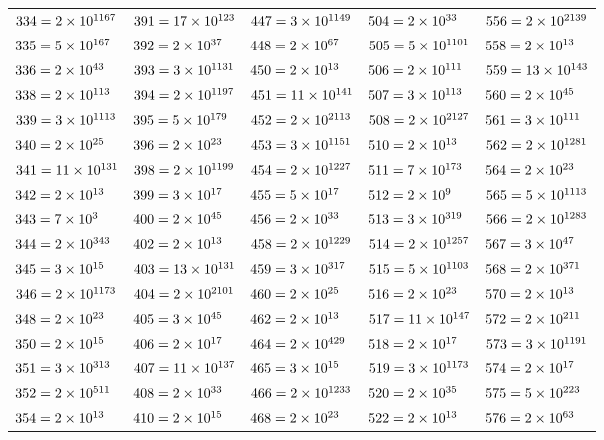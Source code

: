 \documentclass[10pt,a4paper]{book}
\begin{document}
\begin{tabular}{lllll}
	$334=\num{2e{1}167e{1}}$&$391=\num{17e{1}23e{1}}$&$447=\num{3e{1}149e{1}}$&$504=\num{2e{3}3e{2}7e{1}}$&$556=\num{2e{2}139e{1}}$\\
	$335=\num{5e{1}67e{1}}$&$392=\num{2e{3}7e{2}}$&$448=\num{2e{6}7e{1}}$&$505=\num{5e{1}101e{1}}$&$558=\num{2e{1}3e{2}31e{1}}$\\
	$336=\num{2e{4}3e{1}7e{1}}$&$393=\num{3e{1}131e{1}}$&$450=\num{2e{1}3e{2}5e{2}}$&$506=\num{2e{1}11e{1}23e{1}}$&$559=\num{13e{1}43e{1}}$\\
	$338=\num{2e{1}13e{2}}$&$394=\num{2e{1}197e{1}}$&$451=\num{11e{1}41e{1}}$&$507=\num{3e{1}13e{2}}$&$560=\num{2e{4}5e{1}7e{1}}$\\
	$339=\num{3e{1}113e{1}}$&$395=\num{5e{1}79e{1}}$&$452=\num{2e{2}113e{1}}$&$508=\num{2e{2}127e{1}}$&$561=\num{3e{1}11e{1}17e{1}}$\\
	$340=\num{2e{2}5e{1}17e{1}}$&$396=\num{2e{2}3e{2}11e{1}}$&$453=\num{3e{1}151e{1}}$&$510=\num{2e{1}3e{1}5e{1}17e{1}}$&$562=\num{2e{1}281e{1}}$\\
	$341=\num{11e{1}31e{1}}$&$398=\num{2e{1}199e{1}}$&$454=\num{2e{1}227e{1}}$&$511=\num{7e{1}73e{1}}$&$564=\num{2e{2}3e{1}47e{1}}$\\
	$342=\num{2e{1}3e{2}19e{1}}$&$399=\num{3e{1}7e{1}19e{1}}$&$455=\num{5e{1}7e{1}13e{1}}$&$512=\num{2e{9}}$&$565=\num{5e{1}113e{1}}$\\
	$343=\num{7e{3}}$&$400=\num{2e{4}5e{2}}$&$456=\num{2e{3}3e{1}19e{1}}$&$513=\num{3e{3}19e{1}}$&$566=\num{2e{1}283e{1}}$\\
	$344=\num{2e{3}43e{1}}$&$402=\num{2e{1}3e{1}67e{1}}$&$458=\num{2e{1}229e{1}}$&$514=\num{2e{1}257e{1}}$&$567=\num{3e{4}7e{1}}$\\
	$345=\num{3e{1}5e{1}23e{1}}$&$403=\num{13e{1}31e{1}}$&$459=\num{3e{3}17e{1}}$&$515=\num{5e{1}103e{1}}$&$568=\num{2e{3}71e{1}}$\\
	$346=\num{2e{1}173e{1}}$&$404=\num{2e{2}101e{1}}$&$460=\num{2e{2}5e{1}23e{1}}$&$516=\num{2e{2}3e{1}43e{1}}$&$570=\num{2e{1}3e{1}5e{1}19e{1}}$\\
	$348=\num{2e{2}3e{1}29e{1}}$&$405=\num{3e{4}5e{1}}$&$462=\num{2e{1}3e{1}7e{1}11e{1}}$&$517=\num{11e{1}47e{1}}$&$572=\num{2e{2}11e{1}13e{1}}$\\
	$350=\num{2e{1}5e{2}7e{1}}$&$406=\num{2e{1}7e{1}29e{1}}$&$464=\num{2e{4}29e{1}}$&$518=\num{2e{1}7e{1}37e{1}}$&$573=\num{3e{1}191e{1}}$\\
	$351=\num{3e{3}13e{1}}$&$407=\num{11e{1}37e{1}}$&$465=\num{3e{1}5e{1}31e{1}}$&$519=\num{3e{1}173e{1}}$&$574=\num{2e{1}7e{1}41e{1}}$\\
	$352=\num{2e{5}11e{1}}$&$408=\num{2e{3}3e{1}17e{1}}$&$466=\num{2e{1}233e{1}}$&$520=\num{2e{3}5e{1}13e{1}}$&$575=\num{5e{2}23e{1}}$\\
	$354=\num{2e{1}3e{1}59e{1}}$&$410=\num{2e{1}5e{1}41e{1}}$&$468=\num{2e{2}3e{2}13e{1}}$&$522=\num{2e{1}3e{2}29e{1}}$&$576=\num{2e{6}3e{2}}$\\
\end{tabular}
\end{document}
